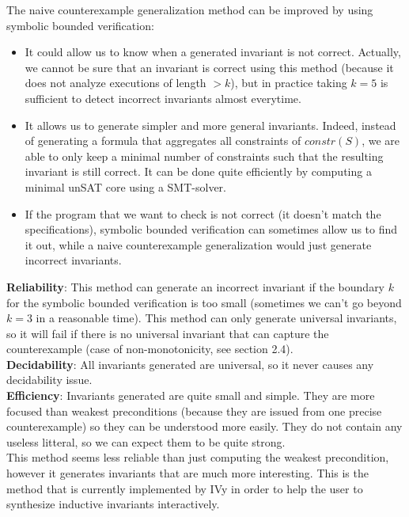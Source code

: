\documentclass[11pt,a4paper,oldfontcommands,openany]{memoir}
\begin{document}
    The naive counterexample generalization method can be improved by using symbolic bounded verification\cite{Padon:2016:ISV:2908080.2908118}:
    \begin{itemize}
        \item It could allow us to know when a generated invariant is not correct.
        Actually, we cannot be sure that an invariant is correct using this method (because it does not analyze executions of length \(> k\)),
        but in practice taking \(k=5\) is sufficient to detect incorrect invariants almost everytime.
        \item It allows us to generate simpler and more general invariants. Indeed, instead of generating a formula that
        aggregates all constraints of \(constr(S)\), we are able to only keep a minimal number of constraints
        such that the resulting invariant is still correct. It can be done quite efficiently by computing a minimal unSAT core using a SMT-solver.
        \item If the program that we want to check is not correct (it doesn't match the specifications), symbolic bounded verification
        can sometimes allow us to find it out, while a naive counterexample generalization would just generate incorrect invariants.
    \end{itemize}\hfill

    \textbf{Reliability}: This method can generate an incorrect invariant if the boundary \(k\) for the symbolic bounded verification
    is too small (sometimes we can't go beyond \(k=3\) in a reasonable time). This method can only generate universal invariants,
    so it will fail if there is no universal invariant that can capture the counterexample (case of non-monotonicity, see section 2.4).\\

    \textbf{Decidability}: All invariants generated are universal, so it never causes any decidability issue.\\

    \textbf{Efficiency}: Invariants generated are quite small and simple. They are more focused than weakest preconditions
    (because they are issued from one precise counterexample) so they can be understood more easily.
    They do not contain any useless litteral, so we can expect them to be quite strong.\\

    This method seems less reliable than just computing the weakest precondition, however it generates invariants that are much more interesting.
    This is the method that is currently implemented by IVy in order to help the user to synthesize inductive invariants interactively.
\end{document}
